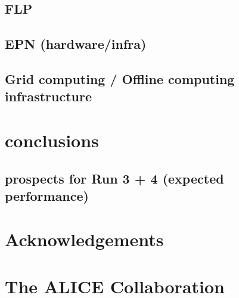 \documentclass[ALICE,manyauthors]{cernphprep}
\begin{document}
\subsection{FLP}
\subsection{EPN (hardware/infra)}
\subsection{Grid computing / Offline computing infrastructure}

\section{conclusions}
\subsection{prospects for Run 3 + 4 (expected performance)}

\cleardoublepage
\newenvironment{acknowledgement}{\relax}{\relax}
\begin{acknowledgement}
\section*{Acknowledgements}
%
\end{acknowledgement}



\newpage
\appendix

%
%

\section{The ALICE Collaboration}
\label{app:collab}
%
\end{document}

